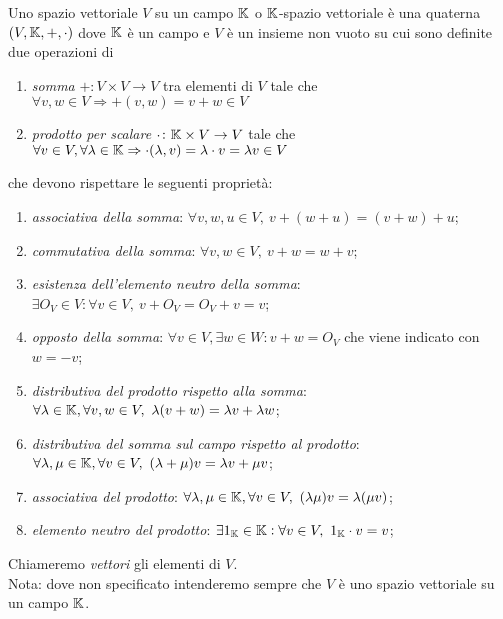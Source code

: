 \begin{definition}
	Uno spazio vettoriale $ V $ su un campo $ \mathbb{K} $ o $ \mathbb{K} $-spazio vettoriale è una quaterna $ (V, \mathbb{K}, +, \cdot) $ 
	dove $ \mathbb{K} $ è un campo e $ V $ è un insieme non vuoto su cui sono definite due operazioni di 

	\begin{enumerate}
		\item \emph{somma} $ + \colon V \times V \to V $ tra elementi di $ V $ tale che $ \forall v, w \in V \Rightarrow + (v, w) = v + w \in V $
		\item \emph{prodotto per scalare} $ \cdot \colon \mathbb{K} \times V \to V $ tale che $ \forall v \in V, \forall \lambda \in \mathbb{K} \Rightarrow \cdot (\lambda, v) = \lambda \cdot v = \lambda v \in V $
	\end{enumerate}
	che devono rispettare le seguenti proprietà:
	\begin{enumerate}[label=(\roman*)]
		\item \emph{associativa della somma}: $ \forall v, w, u \in V, \ v + (w + u) = (v + w) + u $;
		\item \emph{commutativa della somma}: $ \forall v, w \in V, \ v + w = w + v $;
		\item \emph{esistenza dell'elemento neutro della somma}: $ \exists O_{V} \in V : \forall v \in V, \ v + O_{V} = O_{V} + v = v $;
		\item \emph{opposto della somma}: $ \forall v \in V, \exists w \in W : v + w = O_{V} $ che viene indicato con $ w = -v $;
		\item \emph{distributiva del prodotto rispetto alla somma}: $ \forall \lambda \in \K, \forall v, w \in V, \ \lambda (v + w) = \lambda v + \lambda w $;
		\item \emph{distributiva del somma sul campo rispetto al prodotto}: $ \forall \lambda, \mu \in \mathbb{K}, \forall v \in V, \ (\lambda + \mu) v = \lambda v + \mu v $;
		\item \emph{associativa del prodotto}: $ \forall \lambda, \mu \in \K, \forall v \in V, \ (\lambda \mu) v = \lambda (\mu v) $;
		\item \emph{elemento neutro del prodotto}: $ \exists 1_{\mathbb{K}} \in \mathbb{K} : \forall v \in V, \ 1_{\mathbb{K}} \cdot v = v $;
	\end{enumerate}
	Chiameremo \emph{vettori} gli elementi di $ V $. \\
	\textsf{Nota: dove non specificato intenderemo sempre che $ V $ è uno spazio vettoriale su un campo $ \mathbb{K} $.}
\end{definition}

